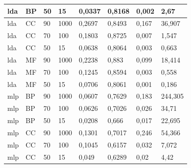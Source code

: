\documentclass[12pt]{report}
\begin{document}
\begin{appendices}
\begin{longtable}[h]{|l|l|l|l|l|l|l|l|}
lda                & BP            & 50                & 15                 & 0,0337         & 0,8168         & 0,002                    & 2,67                 \\ \hline
lda                & CC            & 90                & 1000               & 0,2697         & 0,8493         & 0,167                    & 36,907               \\ \hline
lda                & CC            & 70                & 100                & 0,1803         & 0,8725         & 0,007                    & 1,547                \\ \hline
lda                & CC            & 50                & 15                 & 0,0638         & 0,8064         & 0,003                    & 0,663                \\ \hline
lda                & MF            & 90                & 1000               & 0,2238         & 0,883          & 0,099                    & 18,414               \\ \hline
lda                & MF            & 70                & 100                & 0,1245         & 0,8594         & 0,003                    & 0,558                \\ \hline
lda                & MF            & 50                & 15                 & 0,0706         & 0,8061         & 0,001                    & 0,186                \\ \hline
mlp                & BP            & 90                & 1000               & 0,0607         & 0,7629         & 0,183                    & 244,305              \\ \hline
mlp                & BP            & 70                & 100                & 0,0626         & 0,7026         & 0,026                    & 34,71                \\ \hline
mlp                & BP            & 50                & 15                 & 0,0208         & 0,666          & 0,017                    & 22,695               \\ \hline
mlp                & CC            & 90                & 1000               & 0,1301         & 0,7017         & 0,246                    & 54,366               \\ \hline
mlp                & CC            & 70                & 100                & 0,1045         & 0,6157         & 0,032                    & 7,072                \\ \hline
mlp                & CC            & 50                & 15                 & 0,049          & 0,6289         & 0,02                     & 4,42                 \\ \hline

\end{longtable}
\end{appendices}
\end{document}
